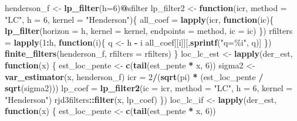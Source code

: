 \documentclass[
  12pt,
  a4paper,french]{article}
\newenvironment{Shaded}{\begin{snugshade}}{\end{snugshade}}
\newcommand{\AttributeTok}[1]{\textcolor[rgb]{0.13,0.29,0.53}{#1}}
\newcommand{\ControlFlowTok}[1]{\textcolor[rgb]{0.13,0.29,0.53}{\textbf{#1}}}
\newcommand{\DecValTok}[1]{\textcolor[rgb]{0.00,0.00,0.81}{#1}}
\newcommand{\FunctionTok}[1]{\textcolor[rgb]{0.13,0.29,0.53}{\textbf{#1}}}
\newcommand{\NormalTok}[1]{#1}
\newcommand{\OtherTok}[1]{\textcolor[rgb]{0.56,0.35,0.01}{#1}}
\newcommand{\SpecialCharTok}[1]{\textcolor[rgb]{0.81,0.36,0.00}{\textbf{#1}}}
\newcommand{\StringTok}[1]{\textcolor[rgb]{0.31,0.60,0.02}{#1}}
\newcommand\1{\mathds{1}}
\begin{document}
\begin{Shaded}
\begin{Highlighting}[]
\NormalTok{henderson\_f }\OtherTok{\textless{}{-}} \FunctionTok{lp\_filter}\NormalTok{(}\AttributeTok{h=}\DecValTok{6}\NormalTok{)}\SpecialCharTok{@}\NormalTok{sfilter}
\NormalTok{lp\_filter2 }\OtherTok{\textless{}{-}} \ControlFlowTok{function}\NormalTok{(icr, }\AttributeTok{method =} \StringTok{"LC"}\NormalTok{, }\AttributeTok{h =} \DecValTok{6}\NormalTok{, }\AttributeTok{kernel =} \StringTok{"Henderson"}\NormalTok{)\{}
\NormalTok{  all\_coef }\OtherTok{=} \FunctionTok{lapply}\NormalTok{(icr, }\ControlFlowTok{function}\NormalTok{(ic)\{}
    \FunctionTok{lp\_filter}\NormalTok{(}\AttributeTok{horizon =}\NormalTok{ h,}
              \AttributeTok{kernel =}\NormalTok{ kernel,}
              \AttributeTok{endpoints =}\NormalTok{ method,}
              \AttributeTok{ic =}\NormalTok{ ic)}
\NormalTok{  \})}
\NormalTok{  rfilters }\OtherTok{=} \FunctionTok{lapply}\NormalTok{(}\DecValTok{1}\SpecialCharTok{:}\NormalTok{h, }\ControlFlowTok{function}\NormalTok{(i)\{}
\NormalTok{    q }\OtherTok{\textless{}{-}}\NormalTok{ h }\SpecialCharTok{{-}}\NormalTok{ i}
\NormalTok{    all\_coef[[i]][,}\FunctionTok{sprintf}\NormalTok{(}\StringTok{"q=\%i"}\NormalTok{, q)]}
\NormalTok{  \})}
  \FunctionTok{finite\_filters}\NormalTok{(henderson\_f, }\AttributeTok{rfilters =}\NormalTok{ rfilters)}
\NormalTok{\}}
\NormalTok{loc\_lc\_est }\OtherTok{\textless{}{-}} 
  \FunctionTok{lapply}\NormalTok{(der\_est, }\ControlFlowTok{function}\NormalTok{(x) \{}
\NormalTok{    est\_loc\_pente }\OtherTok{\textless{}{-}} \FunctionTok{c}\NormalTok{(}\FunctionTok{tail}\NormalTok{(est\_pente }\SpecialCharTok{*}\NormalTok{ x, }\DecValTok{6}\NormalTok{))}
\NormalTok{    sigma2 }\OtherTok{\textless{}{-}} \FunctionTok{var\_estimator}\NormalTok{(x, henderson\_f)}
\NormalTok{    icr }\OtherTok{=} \DecValTok{2}\SpecialCharTok{/}\NormalTok{(}\FunctionTok{sqrt}\NormalTok{(pi) }\SpecialCharTok{*}\NormalTok{ (est\_loc\_pente }\SpecialCharTok{/} \FunctionTok{sqrt}\NormalTok{(sigma2)))}
\NormalTok{    lp\_coef }\OtherTok{=} \FunctionTok{lp\_filter2}\NormalTok{(}\AttributeTok{ic =}\NormalTok{ icr, }
                         \AttributeTok{method =} \StringTok{"LC"}\NormalTok{, }\AttributeTok{h =} \DecValTok{6}\NormalTok{, }\AttributeTok{kernel =} \StringTok{"Henderson"}\NormalTok{)}
\NormalTok{    rjd3filters}\SpecialCharTok{::}\FunctionTok{filter}\NormalTok{(x, lp\_coef)}
\NormalTok{  \})}
\NormalTok{loc\_lc\_if }\OtherTok{\textless{}{-}} 
  \FunctionTok{lapply}\NormalTok{(der\_est, }\ControlFlowTok{function}\NormalTok{(x) \{}
\NormalTok{    est\_loc\_pente }\OtherTok{\textless{}{-}} \FunctionTok{c}\NormalTok{(}\FunctionTok{tail}\NormalTok{(est\_pente }\SpecialCharTok{*}\NormalTok{ x, }\DecValTok{6}\NormalTok{))}

\end{Highlighting}
\end{Shaded}
\end{document}
